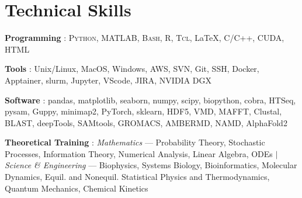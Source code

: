 \documentclass[letterpaper,10pt]{article}
\newcommand{\sectionspace}{
\vspace{-17pt}
}
\newcommand{\subheadingtitlevspace}{
\vspace{-3pt}
}
\newcommand{\titleItem}[1]{
  \textbf{#1}
}
\begin{document}
 \section{\textcolor{color1}{Technical Skills}}
 \subheadingtitlevspace
 \begin{itemize}[leftmargin=0.15in, label={}]
   {\item{
       \vspace{1pt}
       \titleItem{Programming}{: \textsc{Python, MATLAB, Bash, R, Tcl}, \LaTeX, C/C++, CUDA, HTML}\\
       \vspace{1pt}
       \titleItem{Tools}{: Unix/Linux, MacOS, Windows, AWS, SVN, Git, SSH, Docker, Apptainer, slurm, Jupyter, VScode, JIRA, NVIDIA DGX}\\
       \vspace{1pt}
       \titleItem{Software}{: pandas, matplotlib, seaborn, numpy, scipy, biopython, cobra, HTSeq, pysam, Guppy, minimap2, PyTorch, sklearn, HDF5, VMD, MAFFT, Clustal, BLAST, deepTools, SAMtools, GROMACS, AMBERMD, NAMD, AlphaFold2} \\
       \vspace{1pt}
       \titleItem{Theoretical Training}{:
       	\emph{Mathematics} --- Probability Theory, Stochastic Processes, Information Theory, Numerical Analysis, Linear Algebra, ODEs
       	 $|$ 
       	\emph{Science \& Engineering} --- Biophysics, Systems Biology, Bioinformatics, Molecular Dynamics, Equil. and Nonequil. Statistical Physics and Thermodynamics, Quantum Mechanics, Chemical Kinetics}
     }}
 \end{itemize}
 \sectionspace

\end{document}
